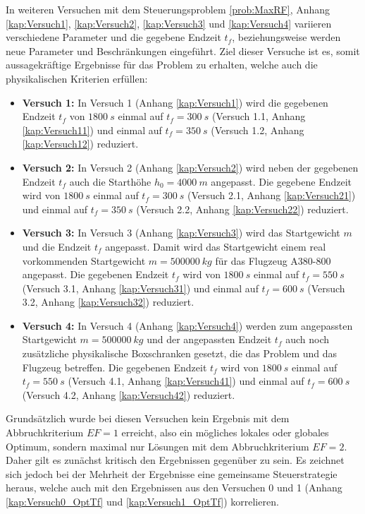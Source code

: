 In weiteren Versuchen mit dem Steuerungsproblem \ref{prob:MaxRF}, Anhang \ref{kap:Versuch1}, \ref{kap:Versuch2}, \ref{kap:Versuch3} und \ref{kap:Versuch4} variieren verschiedene Parameter und die gegebene Endzeit $t_f$, beziehungsweise werden neue Parameter und Beschränkungen eingeführt. Ziel dieser Versuche ist es, somit aussagekräftige Ergebnisse für das Problem zu erhalten, welche auch die physikalischen Kriterien erfüllen:
\begin{itemize}
\item \textbf{Versuch 1:} In Versuch 1 (Anhang \ref{kap:Versuch1}) wird die gegebenen Endzeit $t_f$ von $1800 \ s$ einmal auf $t_f = 300 \ s$ (Versuch 1.1, Anhang \ref{kap:Versuch11}) und einmal auf $t_f = 350 \ s$ (Versuch 1.2, Anhang \ref{kap:Versuch12}) reduziert. 
%
\item \textbf{Versuch 2:} In Versuch 2 (Anhang \ref{kap:Versuch2}) wird neben der gegebenen Endzeit $t_f$ auch die Starthöhe $h_0 = 4000 \ m$ angepasst. Die gegebene Endzeit wird von $1800 \ s$ einmal auf $t_f = 300 \ s$ (Versuch 2.1, Anhang \ref{kap:Versuch21}) und einmal auf $t_f = 350 \ s$ (Versuch 2.2, Anhang \ref{kap:Versuch22}) reduziert.
%
\item \textbf{Versuch 3:} In Versuch 3 (Anhang \ref{kap:Versuch3}) wird das Startgewicht $m$ und die Endzeit $t_f$ angepasst. Damit wird das Startgewicht einem real vorkommenden Startgewicht $m = 500000 \ kg$ für das Flugzeug A380-800 angepasst. Die gegebenen Endzeit $t_f$ wird von $1800 \ s$ einmal auf $t_f = 550 \ s$ (Versuch 3.1, Anhang \ref{kap:Versuch31}) und einmal auf $t_f = 600 \ s$ (Versuch 3.2, Anhang \ref{kap:Versuch32}) reduziert.
%
\item \textbf{Versuch 4:} In Versuch 4 (Anhang \ref{kap:Versuch4}) werden zum angepassten Startgewicht $m = 500000 \ kg$ und der angepassten Endzeit $t_f$ auch noch zusätzliche physikalische Boxschranken gesetzt, die das Problem und das Flugzeug betreffen. Die gegebenen Endzeit $t_f$ wird von $1800 \ s$ einmal auf $t_f = 550 \ s$ (Versuch 4.1, Anhang \ref{kap:Versuch41}) und einmal auf $t_f = 600 \ s$ (Versuch 4.2, Anhang \ref{kap:Versuch42}) reduziert.
\end{itemize}
Grundsätzlich wurde bei diesen Versuchen kein Ergebnis mit dem Abbruchkriterium $EF = 1$ erreicht, also ein mögliches lokales oder globales Optimum, sondern maximal nur Lösungen mit dem Abbruchkriterium $EF = 2$. Daher gilt es zunächst kritisch den Ergebnissen gegenüber zu sein. Es zeichnet sich jedoch bei der Mehrheit der Ergebnisse eine gemeinsame Steuerstrategie heraus, welche auch mit den Ergebnissen aus den Versuchen 0 und 1 (Anhang \ref{kap:Versuch0_OptTf} und \ref{kap:Versuch1_OptTf}) korrelieren.


